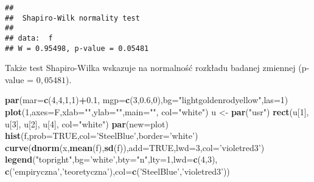 \documentclass[polish,]{book}
\newenvironment{Shaded}{\begin{snugshade}}{\end{snugshade}}
\newcommand{\DataTypeTok}[1]{\textcolor[rgb]{0.13,0.29,0.53}{#1}}
\newcommand{\DecValTok}[1]{\textcolor[rgb]{0.00,0.00,0.81}{#1}}
\newcommand{\FloatTok}[1]{\textcolor[rgb]{0.00,0.00,0.81}{#1}}
\newcommand{\KeywordTok}[1]{\textcolor[rgb]{0.13,0.29,0.53}{\textbf{#1}}}
\newcommand{\NormalTok}[1]{#1}
\newcommand{\OperatorTok}[1]{\textcolor[rgb]{0.81,0.36,0.00}{\textbf{#1}}}
\newcommand{\OtherTok}[1]{\textcolor[rgb]{0.56,0.35,0.01}{#1}}
\newcommand{\StringTok}[1]{\textcolor[rgb]{0.31,0.60,0.02}{#1}}
\begin{document}
\begin{verbatim}
## 
##  Shapiro-Wilk normality test
## 
## data:  f
## W = 0.95498, p-value = 0.05481
\end{verbatim}

Także test Shapiro-Wilka wskazuje na normalność rozkładu badanej zmiennej (p-value = \(0,05481\)).

\begin{Shaded}
\begin{Highlighting}[]
\KeywordTok{par}\NormalTok{(}\DataTypeTok{mar=}\KeywordTok{c}\NormalTok{(}\DecValTok{4}\NormalTok{,}\DecValTok{4}\NormalTok{,}\DecValTok{1}\NormalTok{,}\DecValTok{1}\NormalTok{)}\OperatorTok{+}\FloatTok{0.1}\NormalTok{, }\DataTypeTok{mgp=}\KeywordTok{c}\NormalTok{(}\DecValTok{3}\NormalTok{,}\FloatTok{0.6}\NormalTok{,}\DecValTok{0}\NormalTok{),}\DataTypeTok{bg=}\StringTok{"lightgoldenrodyellow"}\NormalTok{,}\DataTypeTok{las=}\DecValTok{1}\NormalTok{)}
\KeywordTok{plot}\NormalTok{(}\DecValTok{1}\NormalTok{,}\DataTypeTok{axes=}\NormalTok{F,}\DataTypeTok{xlab=}\StringTok{""}\NormalTok{,}\DataTypeTok{ylab=}\StringTok{""}\NormalTok{,}\DataTypeTok{main=}\StringTok{""}\NormalTok{, }\DataTypeTok{col=}\StringTok{"white"}\NormalTok{)}
\NormalTok{u <-}\StringTok{ }\KeywordTok{par}\NormalTok{(}\StringTok{"usr"}\NormalTok{)}
\KeywordTok{rect}\NormalTok{(u[}\DecValTok{1}\NormalTok{], u[}\DecValTok{3}\NormalTok{], u[}\DecValTok{2}\NormalTok{], u[}\DecValTok{4}\NormalTok{], }\DataTypeTok{col=}\StringTok{"white"}\NormalTok{)}
\KeywordTok{par}\NormalTok{(}\DataTypeTok{new=}\NormalTok{plot)}
\KeywordTok{hist}\NormalTok{(f,}\DataTypeTok{prob=}\OtherTok{TRUE}\NormalTok{,}\DataTypeTok{col=}\StringTok{'SteelBlue'}\NormalTok{,}\DataTypeTok{border=}\StringTok{'white'}\NormalTok{)}
\KeywordTok{curve}\NormalTok{(}\KeywordTok{dnorm}\NormalTok{(x,}\KeywordTok{mean}\NormalTok{(f),}\KeywordTok{sd}\NormalTok{(f)),}\DataTypeTok{add=}\OtherTok{TRUE}\NormalTok{,}\DataTypeTok{lwd=}\DecValTok{3}\NormalTok{,}\DataTypeTok{col=}\StringTok{'violetred3'}\NormalTok{)}
\KeywordTok{legend}\NormalTok{(}\StringTok{"topright"}\NormalTok{,}\DataTypeTok{bg=}\StringTok{'white'}\NormalTok{,}\DataTypeTok{bty=}\StringTok{"n"}\NormalTok{,}\DataTypeTok{lty=}\DecValTok{1}\NormalTok{,}\DataTypeTok{lwd=}\KeywordTok{c}\NormalTok{(}\DecValTok{4}\NormalTok{,}\DecValTok{3}\NormalTok{),}
       \KeywordTok{c}\NormalTok{(}\StringTok{'empiryczna'}\NormalTok{,}\StringTok{'teoretyczna'}\NormalTok{),}\DataTypeTok{col=}\KeywordTok{c}\NormalTok{(}\StringTok{'SteelBlue'}\NormalTok{,}\StringTok{'violetred3'}\NormalTok{))}
\end{Highlighting}
\end{Shaded}
\end{document}

